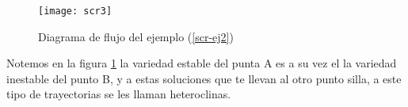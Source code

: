 \begin{ejemplo}
\begin{figure}[H]
  \centering
  \texttt{[image: scr3]}
  \caption{Diagrama de flujo del ejemplo (\ref{scr-ej2}) }
  \label{scr3-im} 
\end{figure}
Notemos en la figura \ref{scr3-im} la variedad estable del punta A es a su vez el la variedad inestable del punto B, y a estas soluciones que te llevan al otro punto silla, a este tipo de trayectorias se les llaman heteroclinas. 
\end{ejemplo}









